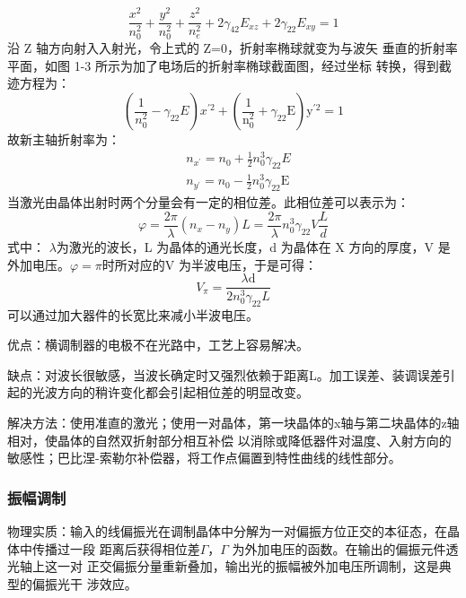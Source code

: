 \documentclass[UTF8]{ctexart}
\newcommand{\singlefig}[4]{
	\begin{figure}[!h]
		\centering
		\texttt{[image: \#1]}
		\caption{#2}
		\label{#3}
	\end{figure}
}
\begin{document}
\begin{equation}
	\frac{x^{2}}{n_{0}^{2}}+\frac{y^{2}}{n_{0}^{2}}+\frac{z^{2}}{n_{e}^{2}}+2 \gamma_{42} E_{x z}+2 \gamma_{22} E_{x y}=1
\end{equation}
沿 Z 轴方向射入入射光，令上式的 Z=0，折射率椭球就变为与波矢
垂直的折射率平面，如图 1-3 所示为加了电场后的折射率椭球截面图，经过坐标
转换，得到截迹方程为：
\begin{equation}
	\left(\frac{1}{n_{0}^{2}}-\gamma_{22} E\right) x^{\prime 2}+\left(\frac{1}{\mathrm{n}_{0}^{2}}+\gamma_{22} \mathrm{E}\right) \mathrm{y}^{\prime 2}=1
	\end{equation}
\newpage
故新主轴折射率为：
\begin{equation}
	\begin{aligned}
	&n_{x^{'}}=n_{0}+\frac{1}{2} n_{0}^{3} \gamma_{22} E \\
	&n_{y^{'}}=n_{0}-\frac{1}{2} n_{0}^{3} \gamma_{22} \mathrm{E}
	\end{aligned}
	\end{equation}
当激光由晶体出射时两个分量会有一定的相位差。此相位差可以表示为：
\begin{equation}\label{xwc}
	\varphi=\frac{2 \pi}{\lambda}\left(n_{x}-n_{y}\right) L=\frac{2 \pi}{\lambda} n_{0}^{3} \gamma_{22} V \frac{L}{d}
\end{equation}
式中： $\lambda$为激光的波长，L 为晶体的通光长度，d 为晶体在 X 方向的厚度，V 是
外加电压。$\varphi = \pi$时所对应的V 为半波电压，于是可得：
\begin{equation}
	V_{\pi}=\frac{\lambda \mathrm{d}}{2 n_{0}^{3} \gamma_{22} L}
	\end{equation}
可以通过加大器件的长宽比来减小半波电压。

优点：横调制器的电极不在光路中，工艺上容易解决。

缺点：对波长很敏感，当波长确定时又强烈依赖于距离L。加工误差、装调误差引起的光波方向的稍许变化都会引起相位差的明显改变。

解决方法：使用准直的激光；使用一对晶体，第一块晶体的x轴与第二块晶体的z轴相对，使晶体的自然双折射部分相互补偿
以消除或降低器件对温度、入射方向的敏感性；巴比涅-索勒尔补偿器，将工作点偏置到特性曲线的线性部分。

\subsubsection{振幅调制}
物理实质：输入的线偏振光在调制晶体中分解为一对偏振方位正交的本征态，在晶体中传播过一段
距离后获得相位差$\Gamma$，$\Gamma$ 为外加电压的函数。在输出的偏振元件透光轴上这一对
正交偏振分量重新叠加，输出光的振幅被外加电压所调制，这是典型的偏振光干
涉效应。
\end{document}
